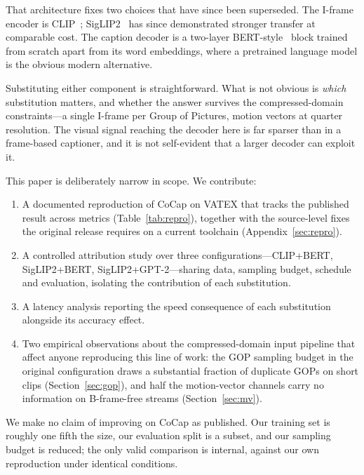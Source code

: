 \documentclass[10pt,twocolumn,letterpaper]{article}
\begin{document}
That architecture fixes two choices that have since been superseded. The I-frame encoder is
CLIP~\cite{clip}; SigLIP2~\cite{siglip2} has since demonstrated stronger transfer at comparable
cost. The caption decoder is a two-layer BERT-style~\cite{bert} block trained from scratch apart
from its word embeddings, where a pretrained language model is the obvious modern alternative.

Substituting either component is straightforward. What is not obvious is \emph{which}
substitution matters, and whether the answer survives the compressed-domain constraints---a
single I-frame per Group of Pictures, motion vectors at quarter resolution. The visual signal
reaching the decoder here is far sparser than in a frame-based captioner, and it is not
self-evident that a larger decoder can exploit it.

This paper is deliberately narrow in scope. We contribute:

\begin{enumerate}\itemsep2pt
\item A documented reproduction of CoCap on VATEX that tracks the published result across
      metrics (Table~\ref{tab:repro}), together with the source-level fixes the original release requires on a
      current toolchain (Appendix~\ref{sec:repro}).
\item A controlled attribution study over three configurations---CLIP+BERT, SigLIP2+BERT,
      SigLIP2+GPT-2---sharing data, sampling budget, schedule and evaluation, isolating the
      contribution of each substitution.
\item A latency analysis reporting the speed consequence of each substitution alongside its
      accuracy effect.
\item Two empirical observations about the compressed-domain input pipeline that affect anyone
      reproducing this line of work: the GOP sampling budget in the original configuration draws
      a substantial fraction of duplicate GOPs on short clips (Section~\ref{sec:gop}), and half
      the motion-vector channels carry no information on B-frame-free streams
      (Section~\ref{sec:mv}).
\end{enumerate}

We make no claim of improving on CoCap as published. Our training set is roughly one fifth the
size, our evaluation split is a subset, and our sampling budget is reduced; the only valid
comparison is internal, against our own reproduction under identical conditions.

\end{document}
